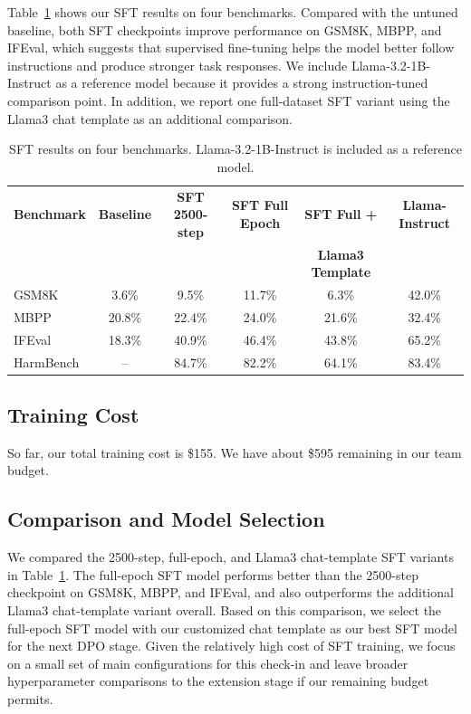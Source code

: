 \documentclass[11pt]{article}
\begin{document}
Table~\ref{tab:sft_results} shows our SFT results on four benchmarks. Compared with the untuned baseline, both SFT checkpoints improve performance on GSM8K, MBPP, and IFEval, which suggests that supervised fine-tuning helps the model better follow 
instructions and produce stronger task responses. We include Llama-3.2-1B-Instruct as a reference model because it 
provides a strong instruction-tuned comparison point. In addition, we report one full-dataset SFT variant using the Llama3 chat template as an additional comparison.
\begin{table}[htbp]
\centering
\small
\begin{tabular}{lccccc}
\hline
\textbf{Benchmark} & \textbf{Baseline} & \textbf{SFT 2500-step} & \textbf{SFT Full Epoch} & \textbf{SFT Full +} & \textbf{Llama-Instruct} \\
 &  &  &  & \textbf{Llama3 Template} &  \\
\hline
GSM8K     & 3.6\%  & 9.5\%  & 11.7\% & 6.3\%  & 42.0\% \\
MBPP      & 20.8\% & 22.4\% & 24.0\% & 21.6\% & 32.4\% \\
IFEval    & 18.3\% & 40.9\% & 46.4\% & 43.8\% & 65.2\% \\
HarmBench & --     & 84.7\% & 82.2\% & 64.1\% & 83.4\% \\
\hline
\end{tabular}
\caption{SFT results on four benchmarks. Llama-3.2-1B-Instruct is included as a reference model.}
\label{tab:sft_results}
\end{table}

\subsection{Training Cost}

So far, our total training cost is \$155. We have about \$595 remaining in our team budget.

\subsection{Comparison and Model Selection}

We compared the 2500-step, full-epoch, and Llama3 chat-template SFT variants in Table~\ref{tab:sft_results}. The full-epoch SFT model performs better than the 2500-step checkpoint on GSM8K, MBPP, and IFEval, 
and also outperforms the additional Llama3 chat-template variant overall. Based on this comparison, we select the full-epoch SFT model with our customized chat template as our best SFT model for the next DPO stage. 
Given the relatively high cost of SFT training, we focus on a small set of main configurations for this check-in and leave broader hyperparameter comparisons to the extension stage if our remaining budget permits.
\end{document}

